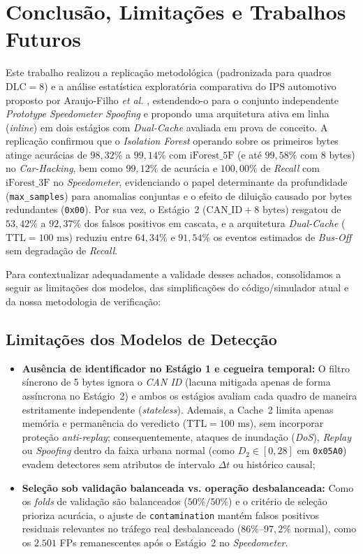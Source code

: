 \documentclass[conference]{IEEEtran}
\begin{document}
\section{Conclusão, Limitações e Trabalhos Futuros}

Este trabalho realizou a replicação metodológica (padronizada para quadros $\text{DLC}=8$) e a análise estatística exploratória comparativa do IPS automotivo proposto por Araujo-Filho \textit{et al.} \cite{araujo2021efficient}, estendendo-o para o conjunto independente \textit{Prototype Speedometer Spoofing} e propondo uma arquitetura ativa em linha (\textit{inline}) em dois estágios com \textit{Dual-Cache} avaliada em prova de conceito. A replicação confirmou que o \textit{Isolation Forest} operando sobre os primeiros bytes atinge acurácias de $98{,}32\%$ a $99{,}14\%$ com $\text{iForest\_5F}$ (e até $99{,}58\%$ com $8$ bytes) no \textit{Car-Hacking}, bem como $99{,}12\%$ de acurácia e $100{,}00\%$ de \textit{Recall} com $\text{iForest\_3F}$ no \textit{Speedometer}, evidenciando o papel determinante da profundidade (\texttt{max\_samples}) para anomalias conjuntas e o efeito de diluição causado por bytes redundantes (\texttt{0x00}). Por sua vez, o Estágio~2 ($\text{CAN\_ID} + 8\text{ bytes}$) resgatou de $53{,}42\%$ a $92{,}37\%$ dos falsos positivos em cascata, e a arquitetura \textit{Dual-Cache} ($\text{TTL}=100\text{ ms}$) reduziu entre $64{,}34\%$ e $91{,}54\%$ os eventos estimados de \textit{Bus-Off} sem degradação de \textit{Recall}.

Para contextualizar adequadamente a validade desses achados, consolidamos a seguir as limitações dos modelos, das simplificações do código/simulador atual e da nossa metodologia de verificação:

\subsection*{Limitações dos Modelos de Detecção}
\begin{itemize}
    \item \textbf{Ausência de identificador no Estágio 1 e cegueira temporal:} O filtro síncrono de 5 bytes ignora o \textit{CAN ID} (lacuna mitigada apenas de forma assíncrona no Estágio~2) e ambos os estágios avaliam cada quadro de maneira estritamente independente (\textit{stateless}). Ademais, a Cache~2 limita apenas memória e permanência do veredicto ($\text{TTL}=100\text{ ms}$), sem incorporar proteção \textit{anti-replay}; consequentemente, ataques de inundação (\textit{DoS}), \textit{Replay} ou \textit{Spoofing} dentro da faixa urbana normal (como $D_2 \in [0, 28]$ em \texttt{0x05A0}) evadem detectores sem atributos de intervalo $\Delta t$ ou histórico causal;
    \item \textbf{Seleção sob validação balanceada vs. operação desbalanceada:} Como os \textit{folds} de validação são balanceados ($50\%/50\%$) e o critério de seleção prioriza acurácia, o ajuste de \texttt{contamination} mantém falsos positivos residuais relevantes no tráfego real desbalanceado ($86\%$--$97{,}2\%$ normal), como os $2.501$ FPs remanescentes após o Estágio~2 no \textit{Speedometer}.
\end{itemize}
\end{document}
